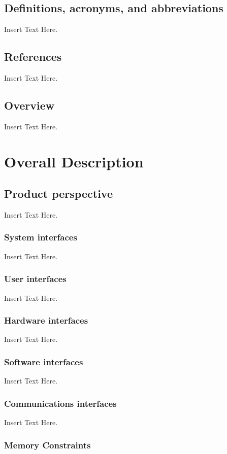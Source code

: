 \documentclass [12pt]{article}
\begin{document}
\subsection{Definitions, acronyms, and abbreviations} 
Insert Text Here.

\subsection{References} 
Insert Text Here.

\subsection{Overview} 
Insert Text Here.

\section{Overall Description}
\subsection{Product perspective}
Insert Text Here.

\subsubsection{System interfaces}
Insert Text Here.

\subsubsection{User interfaces}
Insert Text Here.

\subsubsection{Hardware interfaces} 
Insert Text Here.

\subsubsection{Software interfaces} 
Insert Text Here.

\subsubsection{Communications interfaces} 
Insert Text Here.

\subsubsection{Memory Constraints} 
\end{document}
